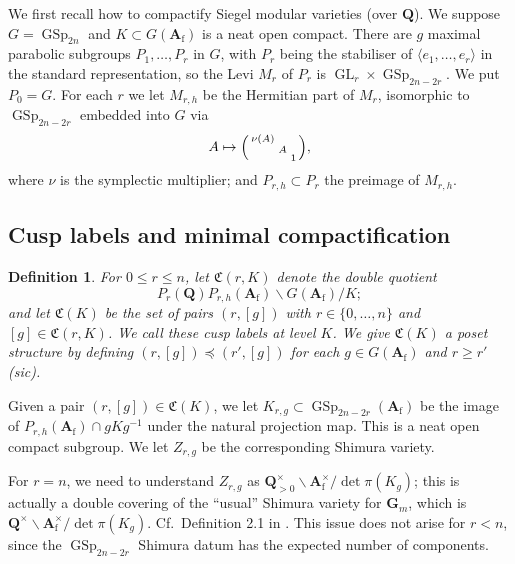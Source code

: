 \documentclass[cjm]{ipart}
\newenvironment{smatrix}{\left( \begin{smallmatrix} } {\end{smallmatrix} \right) }
\theoremstyle{plain}
\newtheorem{definition}[theorem]{Definition}
\theoremstyle{remark}
\DeclareMathOperator{\GL}{GL}
\DeclareMathOperator{\GSp}{GSp}
\newcommand{\Af}{\AA_{\mathrm{f}}}
\newcommand{\QQ}{\mathbf{Q}}
\renewcommand{\AA}{\mathbf{A}}
\numberwithin{equation}{subsection}
\renewcommand{\le}{\leqslant}
\renewcommand{\ge}{\geqslant}
\begin{document}
 We first recall how to compactify Siegel modular varieties (over $\QQ$). We suppose $G = \GSp_{2n}$ and $K \subset G(\Af)$ is a neat open compact. There are $g$ maximal parabolic subgroups $P_1, \dots, P_r$ in $G$, with $P_r$ being the stabiliser of $\langle e_1, \dots, e_r\rangle$ in the standard representation, so the Levi $M_r$ of $P_r$ is $\GL_r \times \GSp_{2n-2r}$. We put $P_0 = G$. For each $r$ we let $M_{r, h}$ be the Hermitian part of $M_r$, isomorphic to $\GSp_{2n-2r}$ embedded into $G$ via
 \[ A \mapsto \begin{smatrix} \nu(A) \\ & A \\ && 1 \end{smatrix},\]
 where $\nu$ is the symplectic multiplier; and $P_{r, h} \subset P_r$ the preimage of $M_{r, h}$. %

 \subsection{Cusp labels and minimal compactification}

  \begin{definition}
   For $0 \le r \le n$, let $\mathfrak{C}(r, K)$ denote the double quotient
   \[ P_r(\QQ) P_{r, h}(\Af) \backslash G(\Af) / K; \]
   and let $\mathfrak{C}(K)$ be the set of pairs $(r, [g])$ with $r \in \{0, \dots, n\}$ and $[g] \in \mathfrak{C}(r, K)$. We call these \emph{cusp labels} at level $K$. We give $\mathfrak{C}(K)$ a poset structure by defining $(r, [g] ) \preccurlyeq (r', [g])$ for each $g \in G(\Af)$ and $r \ge r'$ (sic).
  \end{definition}

  Given a pair $(r, [g]) \in \mathfrak{C}(K)$, we let $K_{r, g} \subset \GSp_{2n-2r}(\Af)$ be the image of $P_{r, h}(\Af) \cap g K g^{-1}$ under the natural projection map. This is a neat open compact subgroup. We let $Z_{r, g}$ be the corresponding Shimura variety.

  \begin{note}
   For $r = n$, we need to understand $Z_{r, g}$ as $\QQ^{\times}_{> 0} \backslash \Af^\times / \det \pi(K_g)$; this is actually a double covering of the ``usual'' Shimura variety for $\mathbf{G}_m$, which is $\QQ^{\times} \backslash \Af^\times / \det \pi(K_g)$. Cf.~Definition 2.1 in \cite{pink90}. This issue does not arise for $r < n$, since the $\GSp_{2n-2r}$ Shimura datum has the expected number of components.
  \end{note}
\end{document}
